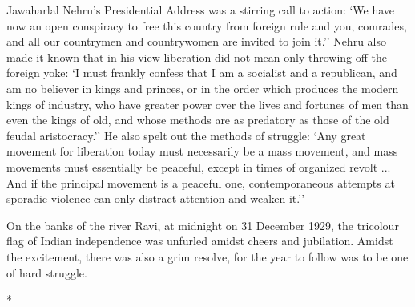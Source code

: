 \begin{multicols}{2}
Jawaharlal Nehru's Presidential Address was a stirring call to action: `We have now an open conspiracy to free this country from foreign rule and you, comrades, and all our countrymen and countrywomen are invited to join it.'' Nehru also made it known that in his view liberation did not mean only throwing off the foreign yoke: `I must frankly confess that I am a socialist and a republican, and am no believer in kings and princes, or in the order which produces the modern kings of industry, who have greater power over the lives and fortunes of men than even the kings of old, and whose methods are as predatory as those of the old feudal aristocracy.'' He also spelt out the methods of struggle: `Any great movement for liberation today must necessarily be a mass movement, and mass movements must essentially be peaceful, except in times of organized revolt ... And if the principal movement is a peaceful one, contemporaneous attempts at sporadic violence can only distract attention and weaken it.'' 

On the banks of the river Ravi, at midnight on 31 December 1929, the tricolour flag of Indian independence was unfurled amidst cheers and jubilation. Amidst the excitement, there was also a grim resolve, for the year to follow was to be one of hard struggle.

\begin{center}*\end{center}

\paragraph*{}


\end{multicols}
